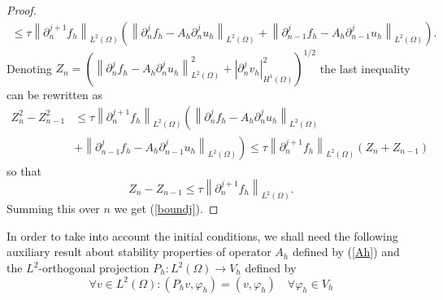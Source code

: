 \documentclass{imanum}
\begin{document}
\begin{proof}
\begin{align*}
\leq \tau\left\| {\partial}^{j+1}_n {f}_h \right\|_{L^2(\Omega)}\left(\left\| \partial^{j}_nf_h-A_h\partial^{j}_n u_h \right\|_{L^2(\Omega)}+ \left\| \partial^{j}_{n-1}f_h-A_h\partial^{j}_{n-1} u_h \right\|_{L^2(\Omega)}\right).
\end{align*}
Denoting $Z_n=\left(\left\| \partial^{j}_nf_h-A_h\partial^{j}_n u_h \right\|_{L^2(\Omega)}^2 + \left| {\partial}^j_{n} v_h \right|_{H^1(\Omega)}^2\right)^{{1}/{2}}$ the last inequality can be rewritten as
\begin{align*}
Z_n^2-Z_{n-1}^2
&\leq \tau\left\| {\partial}^{j+1}_n {f}_h \right\|_{L^2(\Omega)}\left(\left\| \partial^{j}_nf_h-A_h\partial^{j}_n u_h \right\|_{L^2(\Omega)} \right.\\
& \left.+\left\| \partial^{j}_{n-1}f_h-A_h\partial^{j}_{n-1} u_h \right\|_{L^2(\Omega)}\right)
\leq \tau\left\| {\partial}^{j+1}_n {f}_h \right\|_{L^2(\Omega)} (Z_n+Z_{n-1})
\end{align*}
 so that
\[
Z_n-Z_{n-1} \leq \tau\left\| {\partial}^{j+1}_n {f}_h \right\|_{L^2(\Omega)}. 
\]
Summing this over $n$ we get (\ref{boundj}).
 \end{proof}
 
In order to take into account the initial conditions, we shall need the following auxiliary result about stability properties of operator $A_h$ defined by (\ref{Ah}) and the $L^2$-orthogonal projection  $P_h : L^2 (\Omega) \to V_h$ defined by
\begin{equation}\label{Ph}
 \forall v \in L^2 (\Omega) : \left( P_h v, \varphi_h\right) = \left( v,
   \varphi_h\right) \hspace{1em} \forall \varphi_h \in V_h 
\end{equation}
\end{document}
